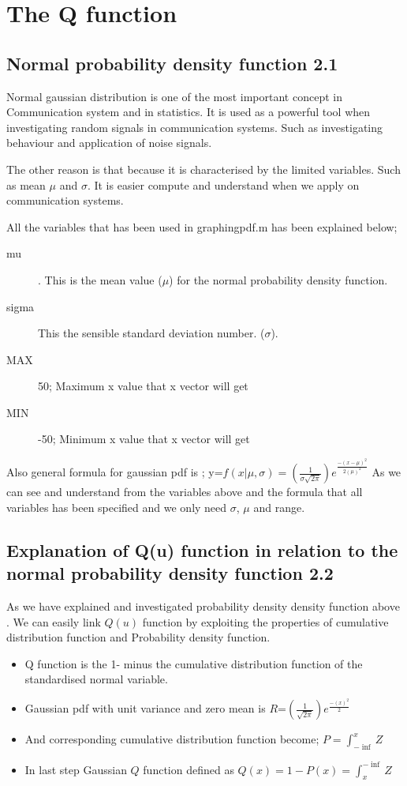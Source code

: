\section{The Q function}

\subsection{Normal probability density function 2.1}
Normal gaussian distribution is one of the most important concept in Communication system and in statistics. It is used as a powerful tool when investigating random signals in communication systems.  Such as investigating behaviour and application of noise signals.

The other reason is that because it is characterised by the limited variables. Such as mean $\mu$ and $\sigma$. It is easier compute and understand when we apply on communication systems.

All the variables that has been used in graphingpdf.m has been explained below;

\begin{description}
	\item [mu] . This is the mean value ($\mu$) for the normal probability density function.
	\item [sigma] This the sensible standard deviation number. ($\sigma$).
	\item [MAX] 50; Maximum x value that x vector will get 
	\item [MIN] -50; Minimum x value that x vector will get
\end{description}

Also general formula for gaussian pdf is ;
y=$f(x|\mu,\sigma)=(\frac{1}{\sigma \sqrt{2 \pi}}) e^{\frac{-(x-\mu)^2}{2(\mu)^2}}$
As we can see and understand from the variables above and the formula that all variables has been specified and we only need $\sigma$, $\mu$ and range.

\subsection{Explanation of Q(u) function in relation to the normal probability density function 2.2 }
As we have explained and investigated probability density density function above . We can easily link $Q(u)$ function by exploiting the properties of cumulative distribution function and Probability density function.
\begin{itemize}
	\item Q function is the 1- minus the cumulative distribution function of the standardised normal variable.
	\item Gaussian pdf with unit variance and zero mean is $R$=$(\frac{1}{\sqrt{2 \pi}}) e^{\frac{-(x)^2}{2}}$
	\item And corresponding cumulative distribution function become; $P=\int_{-\inf}^{x} Z$
	\item In last step Gaussian $Q$ function defined as $Q(x)=1-P(x)=\int_{x}^{-\inf} Z$
\end{itemize}
